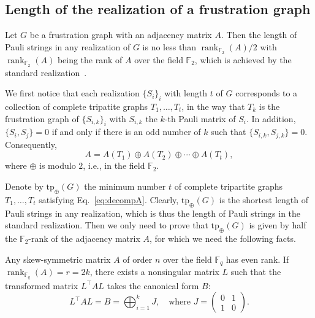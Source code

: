 \subsection{Length of the realization of a frustration graph}\label{sec:proofs2}
\begin{theorem}\label{thm:minlen}
Let $G$ be a frustration graph with an adjacency matrix $A$.  Then the length of Pauli strings in any realization of $G$ is no less than ${\operatorname{rank}_{\mathbb{F}_2}(A)}/2$  with $\operatorname{rank}_{\mathbb{F}_2}(A)$ being the rank of $A$ over the field $\mathbb{F}_2$, which is achieved by the standard realization~\cite{xu2023bounding}.
\end{theorem}

We first notice that each realization $\{S_i\}_i$ with length $t$ of $G$ corresponds to a collection of complete tripatite graphs $T_1, \ldots, T_t$, in the way that $T_k$ is the frustration graph of $\{S_{i,k}\}_i$ with $S_{i,k}$ the $k$-th Pauli matrix of $S_i$.
In addition, $\{S_i, S_j\} = 0$ if and only if there is an odd number of $k$ such that $\{S_{i,k}, S_{j,k}\} = 0$. Consequently,
\begin{equation}\label{eq:decompA}
A = A(T_1) \oplus A(T_2) \oplus \cdots \oplus A(T_t),
\end{equation}
where $\oplus$ is modulo $2$, i.e., in the field $\mathbb{F}_2$.

Denote by $\mathrm{tp}_{\oplus}(G)$ the minimum number $t$ of complete tripartite graphs $T_1, \ldots, T_t$ satisfying Eq.~\eqref{eq:decompA}.
Clearly, $\mathrm{tp}_{\oplus}(G)$ is the shortest length of Pauli strings in any realization, which is thus the length of Pauli strings in the standard realization. Then we only need to prove that $\mathrm{tp}_{\oplus}(G)$ is given by half the $\mathbb{F}_2$-rank of the adjacency matrix $A$, for which we need the following facts.
\begin{lemma}\label{lm:standsymp}
	Any skew-symmetric matrix $A$ of order $n$ over the field $\mathbb{F}_q$ has even rank. If $\operatorname{rank}_{\mathbb{F}_q}(A) = r = 2k$, there exists a nonsingular matrix $L$ such that the transformed matrix $L^\top A L$ takes the canonical form $B$:
\begin{equation}
	L^\top A L = B = \bigoplus_{i=1}^k J, \quad \text{where } J = \begin{pmatrix} 0 & 1 \\ 1 & 0 \end{pmatrix}.
\end{equation}
\end{lemma}

